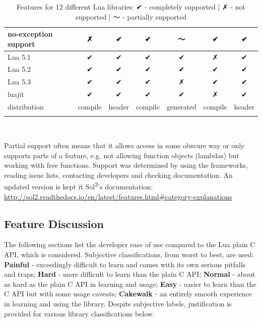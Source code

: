 \documentclass[conference,compsoc]{IEEEtran}
\newcommand{\soltwo}{Sol\textsuperscript{2}}
\begin{document}
\begin{table}[ht!]
\begin{tabular}{l c c c c c c }
		\\ \hline
		no-exception support      &        ✗       &     ✔    &     ✔    &     〜     &        ✔        &    ✔
		\\ \hline
		Lua 5.1                   &        ✔       &     ✔    &     ✔    &     ✔     &        ✗        &    ✔
		\\ \hline
		Lua 5.2                   &        ✔       &     ✔    &     ✔    &     ✔     &        ✔        &    ✔
		\\ \hline
		Lua 5.3                   &        ✔       &     ✔    &     ✔    &     ✗     &        ✔        &    ✔
		\\ \hline
		luajit                    &        ✔       &     ✔    &     ✔    &     ✔     &        ✗        &    ✔
		\\ \hline
		distribution              &     compile    &  header  &  compile & generated &     compile     & header
		\\ \hline \\
	\end{tabular}
	\\
	\caption{Features for 12 different Lua libraries: ✔ - completely supported | ✗ - not supported | 〜 - partially supported}
	Partial support often means that it allows access in some obscure way or only supports parts of a feature, e.g. not allowing function objects (lambdas) but working with free functions. Support was determined by using the frameworks, reading issue lists, contacting developers and checking documentation. An updated version is kept it \soltwo{}'s documentation: \url{http://sol2.readthedocs.io/en/latest/features.html\#category-explanations}
	\label{table:feature-table}
\end{table}

\subsection{Feature Discussion}

The following sections list the developer ease of use compared to the Lua plain C API, which is considered. Subjective classifications, from worst to best, are used: \textbf{Painful} - exceedingly difficult to learn and comes with its own serious pitfalls and traps; \textbf{Hard} - more difficult to learn than the plain C API; \textbf{Normal} - about as hard as the plain C API in learning and usage; \textbf{Easy} - easier to learn than the C API but with some usage caveats; \textbf{Cakewalk} - an entirely smooth experience in learning and using the library. Despite subjective labels, justification is provided for various library classifications below.
\end{document}
